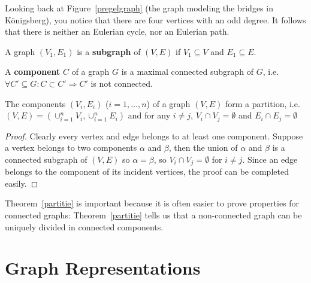 \begin{example}
Looking back at Figure~\ref{pregelgraph} (the graph modeling the
bridges in K\"onigsberg), you notice that there are four vertices with an
odd degree. It follows that there is neither an Eulerian cycle, nor an Eulerian
path.
\end{example}



\begin{definition}[Subgraph]
  \textup{A graph $(V_1,E_1)$ is a \textbf{subgraph} of $(V,E)$ if
    $V_1 \subseteq V$ and $E_1 \subseteq E$.}
\end{definition}



 \begin{definition}
  \textup{A \textbf{component} $C$ of a graph $G$ is a maximal
    connected subgraph of $G$, i.e.
$\forall C' \subseteq G: C \subset C' \Rightarrow C'$ is not connected.}
\end{definition}

 \begin{theorem}
The components $(V_{i},E_{i})$ ($i=1,\ldots,n$) of a graph $(V,E)$
form a partition,
i.e. \\
$(V,E) = (\cup_{i=1}^{n} V_{i},\cup_{i=1}^{n} E_{i})$ and
for any $i \neq j$, $V_{i} \cap V_{j} = \emptyset$ and $E_{i} \cap E_{j} =
\emptyset$
\end{theorem}
\begin{proof}
Clearly every vertex and edge belongs to at least one component.
Suppose a vertex belongs to two components $\alpha$ and $\beta$, then
the union of $\alpha$ and $\beta$ is a connected subgraph of $(V,E)$
so $\alpha = \beta$, so $V_{i} \cap V_{j} = \emptyset$ for $i \neq
j$. Since an edge belongs to the component of its incident vertices,
the proof can be completed easily.
\end{proof}


Theorem~\ref{partitie} is important because it is often easier to
prove properties for connected graphs: Theorem~\ref{partitie} tells us
that a non-connected graph can be uniquely divided in connected
components.


\section{Graph Representations \label{voorstelgraph}}

